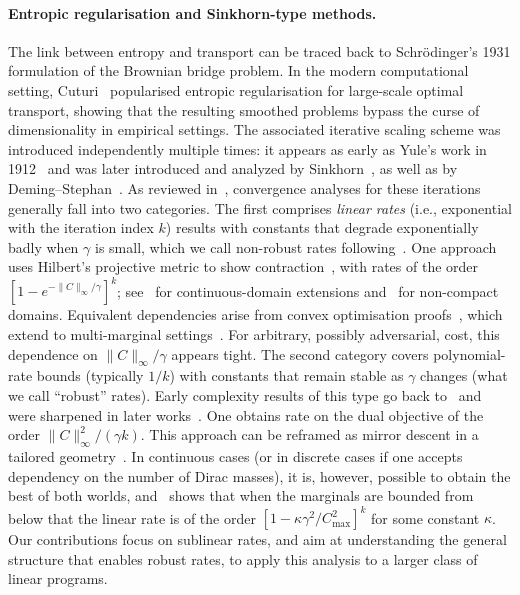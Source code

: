 \documentclass{article}
\theoremstyle{plain}
\newcommand{\norm}[1]{\|#1\|}
\begin{document}
\paragraph{Entropic regularisation and Sinkhorn-type methods.}
The link between entropy and transport can be traced back to Schrödinger's 1931 formulation of the Brownian bridge problem. In the modern computational setting, Cuturi~\citep{Cuturi13} popularised entropic regularisation for large-scale optimal transport, showing that the resulting smoothed problems bypass the curse of dimensionality in empirical settings. The associated iterative scaling scheme was introduced independently multiple times: it appears as early as Yule's work in 1912~\citep{yule1912methods} and was later introduced and analyzed by Sinkhorn~\citep{Sinkhorn64}, as well as by Deming--Stephan~\citep{DemingStephanIPFP}. As reviewed in~\citep{chizat2025sharper}, convergence analyses for these iterations generally fall into two categories. 
%
The first comprises \emph{linear rates} (i.e., exponential with the iteration index $k$) results with constants that degrade exponentially badly when $\gamma$ is small, which we call non-robust rates following~\citep{chizat2025sharper}. One approach uses Hilbert's projective metric to show contraction~\citep{FranklinLorenz89,borwein1994dad}, with rates of the order $[ 1 - e^{-\norm{C}_\infty/\gamma} ]^k$; see~\citep{chen2016hilbertmetric,deligiannidis2024hilbertmetric} for continuous-domain extensions and~\citep{eckstein2024hilbertsprojectivemetricfunctions} for non-compact domains. Equivalent dependencies arise from convex optimisation proofs~\citep{marino2020schrodinger,carlier2022multimarginalsinkhorn}, which extend to multi-marginal settings~\citep{greco2023coupling,conforti2023quantitative}. For arbitrary, possibly adversarial, cost, this dependence on $\norm{C}_\infty/\gamma$ appears tight. 
%
The second category covers polynomial-rate bounds (typically $1/k$) with constants that remain stable as $\gamma$ changes (what we call ``robust'' rates). Early complexity results of this type go back to~\citep{kalantari2008complexity} and were sharpened in later works~\citep{altschuler2017near,chakrabarty2021sinkhornsublinearrate,dvurechensky2018computational,chizat2020faster}. One obtains rate on the dual objective of the order $\norm{C}_\infty^2 / (\gamma k)$. This approach can be reframed as mirror descent in a tailored geometry~\citep{leger2021gradient,aubin2022mirror}.
%
In continuous cases (or in discrete cases if one accepts dependency on the number of Dirac masses), it is, however, possible to obtain the best of both worlds, and~\citep{chizat2025sharper} shows that when the marginals are bounded from below that the linear rate is of the order $[1 - \kappa \gamma^2/C_{\max}^2 ]^k$ for some constant $\kappa$. Our contributions focus on sublinear rates, and aim at understanding the general structure that enables robust rates, to apply this analysis to a larger class of linear programs. 
\end{document}
